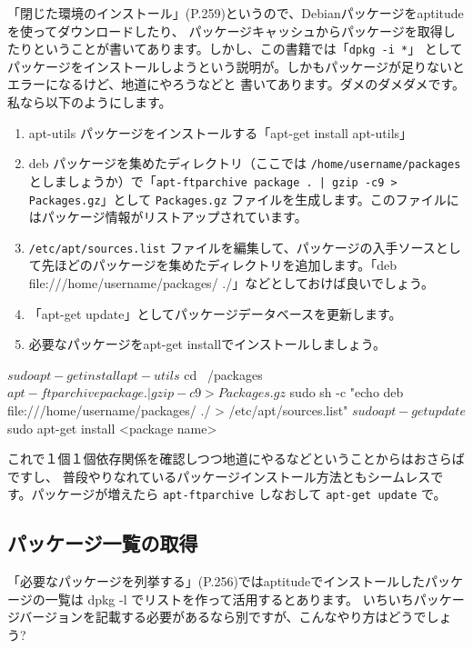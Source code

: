 \documentclass[mingoth,a4paper]{jsarticle}
\begin{document}
「閉じた環境のインストール」(P.259)というので、Debianパッケージをaptitudeを使ってダウンロードしたり、
パッケージキャッシュからパッケージを取得したりということが書いてあります。しかし、この書籍では「\texttt{dpkg -i *}」
としてパッケージをインストールしようという説明が。しかもパッケージが足りないとエラーになるけど、地道にやろうなどと
書いてあります。ダメのダメダメです。私なら以下のようにします。

\begin{enumerate}
 \item apt-utils パッケージをインストールする「apt-get install apt-utils」
 \item deb パッケージを集めたディレクトリ（ここでは \texttt{/home/username/packages} としましょうか）で「\texttt{apt-ftparchive package . | gzip -c9 > Packages.gz}」として \texttt{Packages.gz} ファイルを生成します。このファイルにはパッケージ情報がリストアップされています。
 \item \texttt{/etc/apt/sources.list} ファイルを編集して、パッケージの入手ソースとして先ほどのパッケージを集めたディレクトリを追加します。「deb file:///home/username/packages/ ./」などとしておけば良いでしょう。
 \item 「apt-get update」としてパッケージデータベースを更新します。
 \item 必要なパッケージをapt-get installでインストールしましょう。
\end{enumerate}

\begin{commandline}
$ sudo apt-get install apt-utils
$ cd ~/packages
$ apt-ftparchive package . | gzip -c9 > Packages.gz
$ sudo sh -c "echo deb file:///home/username/packages/ ./ > /etc/apt/sources.list"
$ sudo apt-get update
$ sudo apt-get install <package name>
\end{commandline}

これで１個１個依存関係を確認しつつ地道にやるなどということからはおさらばですし、
普段やりなれているパッケージインストール方法ともシームレスです。パッケージが増えたら \texttt{apt-ftparchive} しなおして \texttt{apt-get update} で。

\subsection{パッケージ一覧の取得}

「必要なパッケージを列挙する」(P.256)ではaptitudeでインストールしたパッケージの一覧は dpkg -l でリストを作って活用するとあります。
いちいちパッケージバージョンを記載する必要があるなら別ですが、こんなやり方はどうでしょう?
\end{document}
